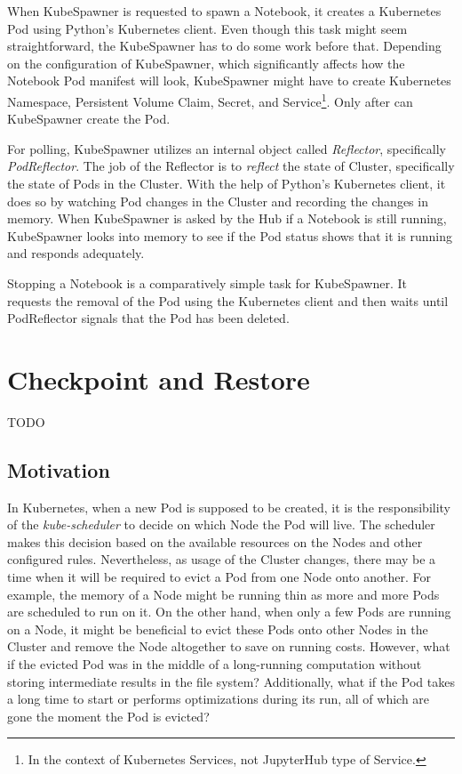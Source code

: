 \documentclass[
  digital,     %
  oneside,     %
  nosansbold,  %
  nocolorbold, %
  lof,         %
  lot,         %
]{fithesis4}
\begin{document}
When KubeSpawner is requested to spawn a Notebook, it creates a Kubernetes Pod using Python's Kubernetes client. Even though this task might seem straightforward, the KubeSpawner has to do some work before that. Depending on the configuration of KubeSpawner, which significantly affects how the Notebook Pod manifest will look, KubeSpawner might have to create Kubernetes Namespace, Persistent Volume Claim, Secret, and Service\footnote{In the context of Kubernetes Services, not JupyterHub type of Service.}.
Only after can KubeSpawner create the Pod.

For polling, KubeSpawner utilizes an internal object called \emph{Reflector}, specifically \emph{PodReflector}. The job of the Reflector is to \emph{reflect} the state of Cluster, specifically the state of Pods in the Cluster. With the help of Python's Kubernetes client, it does so by watching Pod changes in the Cluster and recording the changes in memory. When KubeSpawner is asked by the Hub if a Notebook is still running, KubeSpawner looks into memory to see if the Pod status shows that it is running and responds adequately.

Stopping a Notebook is a comparatively simple task for KubeSpawner. It requests the removal of the Pod using the Kubernetes client and then waits until PodReflector signals that the Pod has been deleted.


\chapter{Checkpoint and Restore}
TODO

\section{Motivation}
In Kubernetes, when a new Pod is supposed to be created, it is the responsibility of the \emph{kube-scheduler} to decide on which Node the Pod will live. The scheduler makes this decision based on the available resources on the Nodes and other configured rules. Nevertheless, as usage of the Cluster changes, there may be a time when it will be required to evict a Pod from one Node onto another. For example, the memory of a Node might be running thin as more and more Pods are scheduled to run on it. On the other hand, when only a few Pods are running on a Node, it might be beneficial to evict these Pods onto other Nodes in the Cluster and remove the Node altogether to save on running costs. However, what if the evicted Pod was in the middle of a long-running computation without storing intermediate results in the file system? Additionally, what if the Pod takes a long time to start or performs optimizations during its run, all of which are gone the moment the Pod is evicted?
\end{document}
